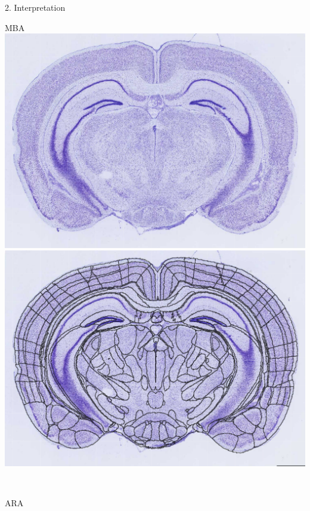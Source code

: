 \documentclass{beamer}
\begin{document}
\begin{frame}{2. Interpretation}
\begin{minipage}{0.3\textwidth}
MBA
\includegraphics[width=\textwidth]{mba2.png}\\
\includegraphics[width=\textwidth]{mba1.png}
\end{minipage}~
\begin{minipage}{0.7\textwidth}
ARA\\

\end{minipage}
\end{frame}
\end{document}
